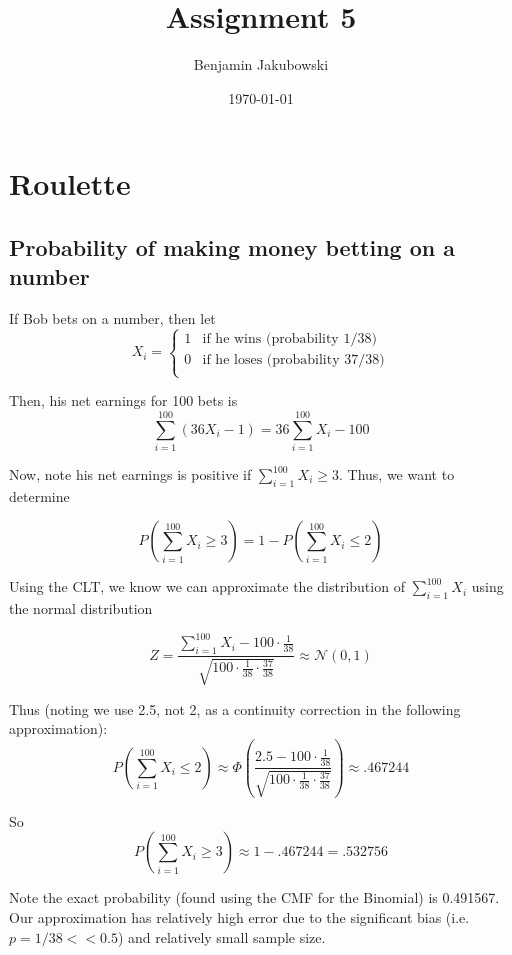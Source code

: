 \documentclass[paper=a4, fontsize=11pt]{scrartcl} %
\title{	Assignment 5}
\author{Benjamin Jakubowski} %
\date{\normalsize\today} %
\numberwithin{equation}{section} %
\numberwithin{figure}{section} %
\numberwithin{table}{section} %
\begin{document}
\maketitle %


\section{Roulette}

\subsection{Probability of making money betting on a number}

If Bob bets on a number, then let
\[
X_i =
\begin{cases}
  1 & \textrm{if he wins (probability 1/38)}\\
  0 & \textrm{if he loses (probability 37/38)}\\
\end{cases}
\]

Then, his net earnings for 100 bets is
\[\sum_{i = 1}^{100} \left(36X_i - 1\right) = 36 \sum_{i = 1}^{100} X_i -100\]

Now, note his net earnings is positive if $\sum_{i = 1}^{100} X_i \geq 3$. Thus, we want to determine

\[P\left(\sum_{i = 1}^{100}X_i \geq 3 \right) = 1 - P\left(\sum_{i = 1}^{100}X_i \leq 2 \right)\]

Using the CLT, we know we can approximate the distribution of $\sum_{i = 1}^{100}X_i$ using the normal distribution

\[Z = \frac{\sum_{i = 1}^{100}X_i - 100 \cdot \frac{1}{38}}{\sqrt{100\cdot\frac{1}{38}\cdot\frac{37}{38}}} \approx \mathcal{N}(0,1)\]

Thus (noting we use 2.5, not 2, as a continuity correction in the following approximation):
\[P\left(\sum_{i = 1}^{100}X_i \leq 2 \right) \approx \Phi\left( \frac{2.5 - 100 \cdot \frac{1}{38}}{\sqrt{100\cdot\frac{1}{38}\cdot\frac{37}{38}}}\right) \approx .467244\]

So \[P\left(\sum_{i = 1}^{100}X_i \geq 3 \right) \approx 1 - .467244 = .532756\]

Note the exact probability (found using the CMF for the Binomial) is 0.491567. Our approximation has relatively high error due to the significant bias (i.e. $p = 1/38 << 0.5$) and relatively small sample size.
\end{document}
